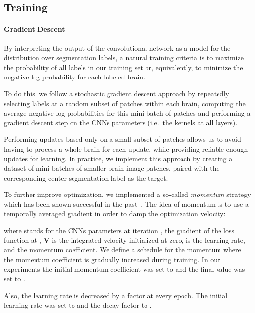 \documentclass[final,5p,times,twocolumn]{elsarticle}
\begin{document}
\subsection{Training}
\label{sec:training}


\paragraph{Gradient Descent}

By interpreting the output of the convolutional network as a model for the distribution over segmentation labels, a natural training criteria is to maximize the probability of all labels in our training set or, equivalently, to minimize the negative log-probability  for each labeled brain.



To do this, we follow a stochastic gradient descent approach by repeatedly selecting labels  at a random subset of patches within each brain, computing the average negative log-probabilities for this mini-batch of patches and performing a gradient descent step on the CNNs parameters (i.e.\ the kernels at all layers).


Performing updates based only on a small subset of patches allows us to avoid having to process a whole brain for each update, while providing reliable enough updates for learning. In practice, we implement this approach by creating a dataset of mini-batches of smaller brain image patches, paired with the corresponding center segmentation label as the target.

To further improve optimization, we implemented a so-called {\em momentum} strategy which has been shown successful in the past~\citep{Krizhevsky-2012-small}.  The idea of momentum is to use a temporally averaged gradient in order to damp the optimization velocity:





where  stands for the CNNs parameters at iteration ,  the gradient of the loss function at , {\bf V} is the integrated velocity initialized at zero,  is the learning rate, and  the momentum coefficient.  We define a schedule for the  momentum  where the momentum coefficient is gradually increased during training. In our experiments the initial momentum coefficient was set to  and the final value was set to .

Also, the learning rate  is decreased by a factor at every epoch. The initial learning rate was set to  and the decay factor to . 
\end{document}
